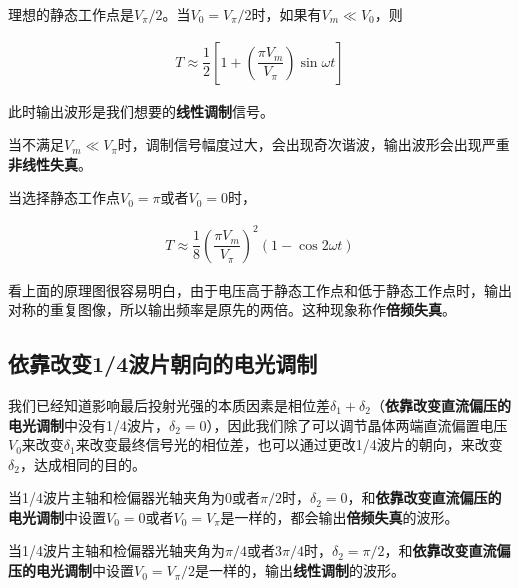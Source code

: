 \documentclass{article}
\begin{document}
理想的静态工作点是$V_{\pi} / 2$。当$V_0 = V_{\pi} / 2$时，如果有$V_m \ll V_0$，则

\begin{equation*}
  \begin{aligned}
    T \approx \dfrac{1}{2} \left[ 1 + \left( \dfrac{\pi V_m}{V_{\pi}}  \right) \sin \omega t \right]  
  \end{aligned}
\end{equation*}

此时输出波形是我们想要的\textbf{线性调制}信号。

当不满足$V_m \ll V_{\pi}$时，调制信号幅度过大，会出现奇次谐波，输出波形会出现严重\textbf{非线性失真}。

当选择静态工作点$V_0 = \pi$或者$V_0 = 0$时，

\begin{equation*}
  \begin{aligned}
    T \approx \dfrac{1}{8} \left( \dfrac{\pi V_m}{V_\pi}  \right)^2 \left( 1 - \cos 2 \omega t \right) 
  \end{aligned}
\end{equation*}

看上面的原理图很容易明白，由于电压高于静态工作点和低于静态工作点时，输出对称的重复图像，所以输出频率是原先的两倍。这种现象称作\textbf{倍频失真}。

\subsection{依靠改变1/4波片朝向的电光调制}

我们已经知道影响最后投射光强的本质因素是相位差$\delta_1 + \delta_2$（\textbf{依靠改变直流偏压的电光调制}中没有1/4波片，$\delta_2 = 0$），因此我们除了可以调节晶体两端直流偏置电压$V_0$来改变$\delta_1$来改变最终信号光的相位差，也可以通过更改1/4波片的朝向，来改变$\delta_2$，达成相同的目的。

当1/4波片主轴和检偏器光轴夹角为$0$或者$\pi/2$时，$\delta_2 = 0$，和\textbf{依靠改变直流偏压的电光调制}中设置$V_0 = 0$或者$V_0 = V_{\pi}$是一样的，都会输出\textbf{倍频失真}的波形。

当1/4波片主轴和检偏器光轴夹角为$\pi/4$或者$3\pi/4$时，$\delta_2 = \pi/2$，和\textbf{依靠改变直流偏压的电光调制}中设置$V_0 = V_{\pi}/2$是一样的，输出\textbf{线性调制}的波形。
\end{document}
